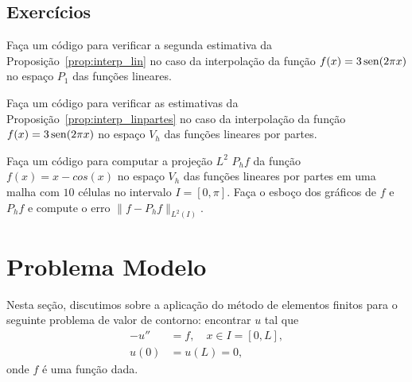 
% 

\subsection{Exercícios}

\begin{exer}
  Faça um código para verificar a segunda estimativa da Proposição~\ref{prop:interp_lin} no caso da interpolação da função $f(x) = 3\operatorname{sen}(2\pi x)$ no espaço $P_1$ das funções lineares.
\end{exer}


\begin{exer}
  Faça um código para verificar as estimativas da Proposição~\ref{prop:interp_linpartes} no caso da interpolação da função $f(x) = 3\operatorname{sen}(2\pi x)$ no espaço $V_h$ das funções lineares por partes.
\end{exer}

\begin{exer}
  Faça um código para computar a projeção $L^2$ $P_hf$ da função $f(x) = x - cos(x)$ no espaço $V_h$ das funções lineares por partes em uma malha com $10$ células no intervalo $I = [0, \pi]$. Faça o esboço dos gráficos de $f$ e $P_hf$ e compute o erro $\|f-P_hf\|_{L^2(I)}$.
\end{exer}

\section{Problema Modelo}\label{cap_mef1d_sec_modelo}

Nesta seção, discutimos sobre a aplicação do método de elementos finitos para o seguinte problema de valor de contorno: encontrar $u$ tal que
\begin{align}
  -u'' &= f,\quad x\in I=[0,L],\label{eq:prob_eq}\\
  u(0) &= u(L) = 0,\label{eq:prob_bc}
\end{align}
onde $f$ é uma função dada.

